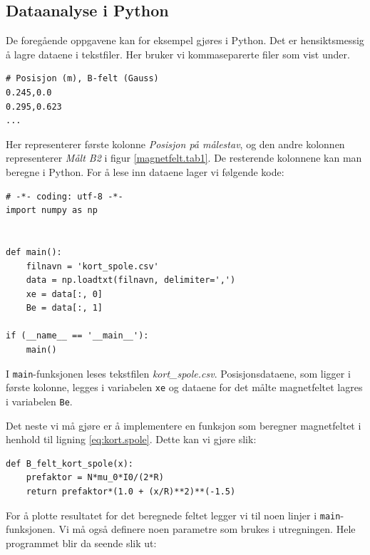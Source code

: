 \documentclass[../Elmag-labhefte-2020.tex]{subfiles}
\begin{document}
\subsection{Dataanalyse i Python}
De foregående oppgavene kan for eksempel gjøres i Python. Det er hensiktsmessig å lagre dataene i tekstfiler. Her bruker vi kommaseparerte filer som vist under.

\begin{verbatim}
# Posisjon (m), B-felt (Gauss)
0.245,0.0
0.295,0.623
...
\end{verbatim}

Her representerer første kolonne \emph{Posisjon på målestav}, og den andre kolonnen representerer \emph{Målt B2} i figur \ref{magnetfelt.tab1}. De resterende kolonnene kan man beregne i Python. For å lese inn dataene lager vi følgende kode:

\begin{verbatim}
# -*- coding: utf-8 -*-
import numpy as np


def main():
    filnavn = 'kort_spole.csv'
    data = np.loadtxt(filnavn, delimiter=',')
    xe = data[:, 0]
    Be = data[:, 1]

if (__name__ == '__main__'):
    main()
\end{verbatim}

I \texttt{main}-funksjonen leses tekstfilen \emph{kort\_spole.csv}. Posisjonsdataene, som ligger i første kolonne, legges i variabelen \texttt{xe} og dataene for det målte magnetfeltet lagres i variabelen \texttt{Be}.

Det neste vi må gjøre er å implementere en funksjon som beregner magnetfeltet i henhold til ligning \eqref{eq:kort.spole}. Dette kan vi gjøre slik:

\begin{verbatim}
def B_felt_kort_spole(x):
    prefaktor = N*mu_0*I0/(2*R)
    return prefaktor*(1.0 + (x/R)**2)**(-1.5)
\end{verbatim}

For å plotte resultatet for det beregnede feltet legger vi til noen linjer i \texttt{main}-funksjonen. Vi må også definere noen parametre som brukes i utregningen. Hele programmet blir da seende slik ut:
\end{document}
